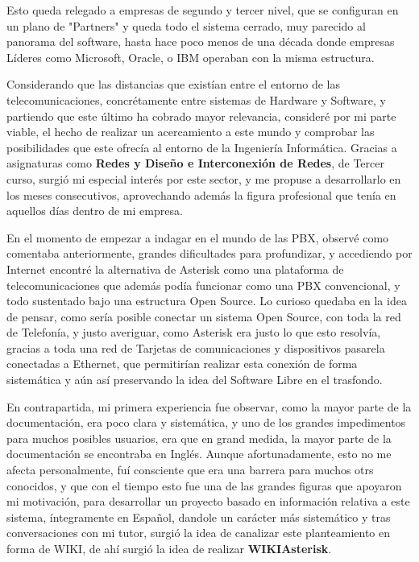 Esto queda relegado a empresas de segundo y tercer nivel, que se configuran en un plano de "Partners" y queda todo el sistema cerrado, muy parecido al panorama del software, hasta hace poco menos de una década donde empresas Líderes como Microsoft, Oracle, o IBM operaban con la misma estructura.

Considerando que las distancias que existían entre el entorno de las telecomunicaciones, concrétamente entre sistemas de Hardware y Software, y partiendo que este último ha cobrado mayor relevancia, consideré por mi parte viable, el hecho de realizar un acercamiento a este mundo y comprobar las posibilidades que este ofrecía al entorno de la Ingeniería Informática. Gracias a asignaturas como \textbf{Redes y Diseño e Interconexión de Redes}, de Tercer curso, surgió mi especial interés por este sector, y me propuse a desarrollarlo en los meses consecutivos, aprovechando además la figura profesional que tenía en aquellos días dentro de mi empresa.

En el momento de empezar a indagar en el mundo de las PBX, observé como comentaba anteriormente, grandes dificultades para profundizar, y accediendo por Internet encontré la alternativa de Asterisk como una plataforma de telecomunicaciones que además podía funcionar como una PBX convencional, y todo sustentado bajo una estructura Open Source. Lo curioso quedaba en la idea de pensar, como sería posible conectar un sistema Open Source, con toda la red de Telefonía, y justo averiguar, como Asterisk era justo lo que esto resolvía, gracias a toda una red de Tarjetas de comunicaciones y dispositivos pasarela conectadas a Ethernet, que permitirían realizar esta conexión de forma sistemática y aún así preservando la idea del Software Libre en el trasfondo.

En contrapartida, mi primera experiencia fue observar, como la mayor parte de la documentación, era poco clara y sistemática, y uno de los grandes impedimentos para muchos posibles usuarios, era que en grand medida, la mayor parte de la documentación se encontraba en Inglés. Aunque afortunadamente, esto no me afecta personalmente, fuí consciente que era una barrera para muchos otrs conocidos, y que con el tiempo esto fue una de las grandes figuras que apoyaron mi motivación, para desarrollar un proyecto basado en información relativa a este sistema, íntegramente en Español, dandole un carácter más sistemático y tras conversaciones con mi tutor, surgió la idea de canalizar este planteamiento en forma de WIKI, de ahí surgió la idea de realizar \textbf{WIKIAsterisk}.

